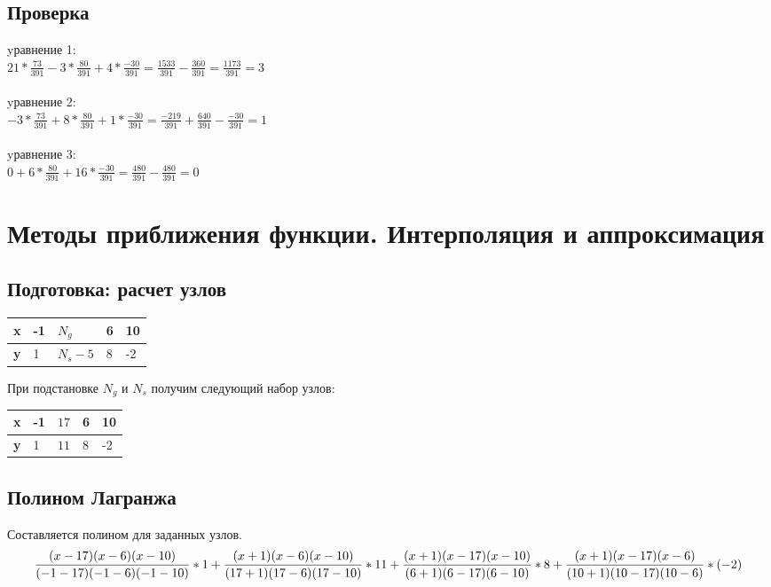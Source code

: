 \documentclass{article}
\begin{document}
\subsection{Проверка}
yравнение 1:\\
$21 * \frac{73}{391} -3*\frac{80}{391} + 4 * \frac{-30}{391}
= \frac{1533}{391} - \frac{360}{391}
= \frac{1173}{391} 
= 3$
\\\\
yравнение 2:\\
$ -3 * \frac{73}{391} + 8*\frac{80}{391} + 1 *\frac{-30}{391}
= \frac{-219}{391} + \frac{640}{391} - \frac{-30}{391}
= 1$
\\\\
yравнение 3:\\
$0 + 6*\frac{80}{391} + 16 *\frac{-30}{391}
= \frac{480}{391} -\frac{480}{391} 
= 0$

\section{Методы приближения функции. Интерполяция и аппроксимация}

\subsection{Подготовка: расчет узлов}
\begin{table}[!h]
  \begin{tabular}{|l|l|l|l|l|}
  \hline
  \bfseries x & -1 & $N_{g}$   & 6 & 10\\
  \hline
  \bfseries y &  1 & $N_{s}-5$ & 8 & -2\\
  \hline
  \end{tabular}
\end{table}
При подстановке $N_{g}$ и $N_{s}$ получим следующий набор узлов:
\begin{table}[!h]
  \begin{tabular}{|l|l|l|l|l|}
  \hline
  \bfseries x & -1 & $17$ & 6 & 10\\
  \hline
  \bfseries y &  1 & $11$ & 8 & -2\\
  \hline
  \end{tabular}
\end{table}
 
\subsection{Полином Лагранжа}
Составляется полином для заданных узлов.
\begin{displaymath}
  \frac{(x-17)(x-6)(x-10)}{(-1-17)(-1-6)(-1-10)} *1 +
  \frac{(x+1)(x-6)(x-10)}{(17+1)(17-6)(17-10)} * 11 + \\
  \frac{(x+1)(x-17)(x-10)}{(6+1)(6-17)(6-10)} * 8 + 
  \frac{(x+1)(x-17)(x-6)}{(10+1)(10-17)(10-6)} * (-2)
\end{displaymath}
\end{document}
